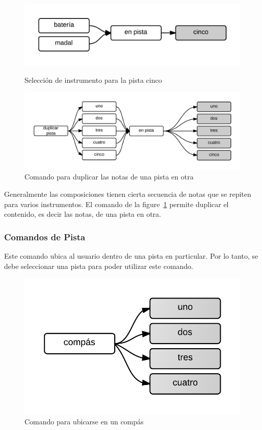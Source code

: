 \begin{figure}[H] 
\begin{minipage}[b]{0.5\linewidth}
\centering
\includegraphics[width=1\linewidth]{./graphics/inst-p5.png}
\caption{Selecci\'on de instrumento para la pista cinco}
\label{figure:cmd-inst-p5}
\end{minipage}
\quad
\begin{minipage}[b]{0.5\linewidth}
\centering
\includegraphics[width=1\linewidth]{./graphics/dup-pista.png}
\caption{Comando para duplicar las notas de una pista en otra}
\label{figure:cmd-dup-pista}
\end{minipage}
\end{figure}

Generalmente las composiciones tienen cierta secuencia de notas que se repiten para varios instrumentos. El comando de la 
figure~\ref{figure:cmd-dup-pista} permite duplicar el contenido, es decir las notas, de una pista en otra. 

\subsubsection{Comandos de Pista} 

Este comando ubica al usuario dentro de una pista en particular. Por lo tanto, se debe
seleccionar una pista para poder utilizar este comando.

\begin{figure}[H] 
\centering
\includegraphics[width=0.4\linewidth]{./graphics/cmd-compas.png}
\caption{Comando para ubicarse en un comp\'as}
\label{figure:cmd-compas}
\quad
\end{figure}

